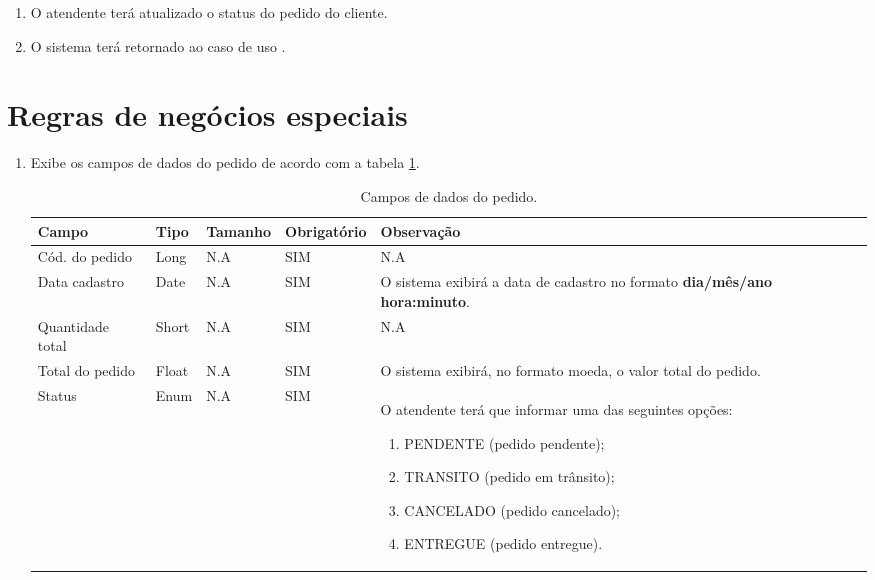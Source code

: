 \begin{enumerate}
	\item O atendente terá atualizado o status do pedido do cliente.
	\item O sistema terá retornado ao caso de uso .	
\end{enumerate}

\section{Regras de negócios especiais}

\begin{enumerate}[label=RN\arabic*]
	\item Exibe os campos de dados do pedido de acordo com a tabela \ref{uc009_tb_rn1}. \label{uc009_rn:1}
	\begin{table}[htb]
		\ABNTEXfontereduzida
		\caption[Campos de dados do pedido]{Campos de dados do pedido.}
		\label{uc009_tb_rn1}
		\begin{tabular}{|p{3.0cm}|p{2.0cm}|p{1.5cm}|p{2.0cm}|p{5.75cm}|}
			\hline
			\textbf{Campo}   & \textbf{Tipo} & \textbf{Tamanho} & \textbf{Obrigatório} & \textbf{Observação}                                                                                                                                              \\ \hline
			Cód. do pedido   & Long          & N.A & SIM & N.A                                                                                                                                                              \\ \hline
			Data cadastro    & Date          & N.A & SIM & O sistema exibirá a data de cadastro no formato \textbf{dia/mês/ano hora:minuto}.                                                                                \\ \hline
			Quantidade total & Short         & N.A & SIM & N.A                                                                                                                                                              \\ \hline
			Total do pedido  & Float         & N.A & SIM & O sistema exibirá, no formato moeda, o valor total do pedido.                                                                                                    \\ \hline
			Status           & Enum          & N.A & SIM & O atendente terá que informar uma das seguintes opções: 	
			\begin{enumerate}
				\item PENDENTE (pedido pendente);
				\item TRANSITO (pedido em trânsito);
				\item CANCELADO (pedido cancelado);
				\item ENTREGUE (pedido entregue).
			\end{enumerate}\\ \hline
		\end{tabular}
	\end{table}
\end{enumerate}